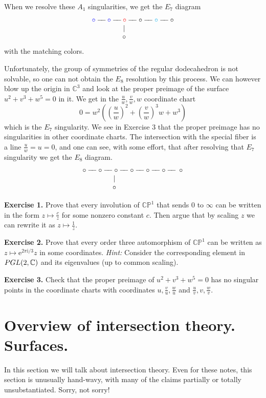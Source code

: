 \documentclass[11pt]{article}
\numberwithin{equation}{section}
\numberwithin{footnote}{section}
\newcommand{\blue}{\color{blue}}
\newcommand{\red}{\color{red}}
\newcommand{\cyan}{\color{cyan}}
\newcommand{\ee}{{\mathrm e}}
\newcommand{\ii}{{\mathrm i}}
\renewcommand{\P}{{\mathbb P}}
\newcommand{\C}{{\mathbb C}}
\begin{document}
\noindent
When we resolve these $A_1$ singularities, we get the $E_7$ diagram
$$
\begin{array}{c}
{\blue \circ} - \hskip -5pt - \,{\blue \circ} - \hskip -5pt -\,{\red \circ}  - \hskip -5pt - \circ  - \hskip -5pt -{\cyan \circ} - \hskip -5pt - \hskip 2pt \circ \\
\vert\hskip 21pt~\\
\circ \hskip 21pt~
\end{array}
$$
with the matching colors.

\smallskip
Unfortunately, the group of symmetries of the regular dodecahedron is not solvable, so one can not obtain the $E_8$ resolution by this process. We can however blow up the origin in $\C^3$ and look at the proper preimage of the surface $u^2+ v^3 + w^5=0$ in it. We get in the $\frac uw, \frac vw, w$ coordinate chart
$$
0= w^2 \left(
\left (\frac uw \right)^2 + \left (\frac vw \right)^3 w + w^3
\right)
$$
which is the $E_7$ singularity. We see in Exercise 3 that the proper preimage has no singularities in other coordinate charts.
The intersection with the special fiber is a line $\frac uw = u = 0$, and one can see, with some effort, that after resolving that $E_7$ singularity we get the $E_8$ diagram.
$$
\begin{array}{c}
\circ - \hskip -5pt - \circ - \hskip -5pt - \circ  - \hskip -5pt - \circ  - \hskip -5pt -\circ  - \hskip -5pt -\circ - \hskip -5pt - \hskip 2pt \circ \\
\vert\hskip 48pt~\\
\circ \hskip 48pt~
\end{array}
$$


{\bf Exercise 1.}
 Prove that every involution of $\C\P^1$ that sends $0$ to $\infty$ can be written in the form $z\mapsto \frac cz$ for some nonzero constant $c$. Then argue that by scaling $z$ we can rewrite it as $z\mapsto \frac 1z$.

{\bf Exercise 2.} Prove that every order three automorphism of $\C\P^1$ can be written as $z\mapsto \ee^{2\pi\ii/3}z$ in some coordinates. \emph{Hint:} Consider the corresponding element in ${\rm PGL}(2,\C)$ and its eigenvalues (up to common scaling).


{\bf Exercise 3.} Check that the proper preimage of $u^2+v^3 + w^5=0$ has no singular points in the coordinate charts with coordinates $u,\frac vu,\frac wu$ and $\frac uv, v, \frac wv$.

\section{Overview of intersection theory. Surfaces.}\label{sec.int}
In this section we will talk about intersection theory. Even for these notes, this section is unusually hand-wavy, with many of the claims partially or totally unsubstantiated. Sorry, not sorry!
\end{document}
